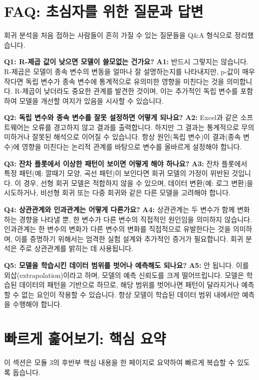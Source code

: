 \documentclass[11pt,a4paper]{article}
\begin{document}
\newpage
\section*{FAQ: 초심자를 위한 질문과 답변}
회귀 분석을 처음 접하는 사람들이 흔히 가질 수 있는 질문들을 Q\&A 형식으로 정리했습니다.

\begin{tcolorbox}[colback=myblue!10!white,colframe=myblue!50!black,title={자주 묻는 질문}]
\textbf{Q1: R-제곱 값이 낮으면 모델이 쓸모없는 건가요?}
\textbf{A1:} 반드시 그렇지는 않습니다. R-제곱은 모델이 종속 변수의 변동을 얼마나 잘 설명하는지를 나타내지만, p-값이 매우 작다면 독립 변수가 종속 변수에 통계적으로 유의미한 영향을 미친다는 것을 의미합니다. R-제곱이 낮더라도 중요한 관계를 발견한 것이며, 이는 추가적인 독립 변수를 포함하여 모델을 개선할 여지가 있음을 시사할 수 있습니다.

\textbf{Q2: 독립 변수와 종속 변수를 잘못 설정하면 어떻게 되나요?}
\textbf{A2:} Excel과 같은 소프트웨어는 오류를 경고하지 않고 결과를 출력합니다. 하지만 그 결과는 통계적으로 무의미하거나 잘못된 해석으로 이어질 수 있습니다. 항상 원인(독립 변수)이 결과(종속 변수)에 영향을 미친다는 논리적 관계를 바탕으로 변수를 올바르게 설정해야 합니다.

\textbf{Q3: 잔차 플롯에서 이상한 패턴이 보이면 어떻게 해야 하나요?}
\textbf{A3:} 잔차 플롯에서 특정 패턴(예: 깔때기 모양, 곡선 패턴)이 보인다면 회귀 모델의 가정이 위반된 것입니다. 이 경우, 선형 회귀 모델은 적합하지 않을 수 있으며, 데이터 변환(예: 로그 변환)을 시도하거나, 비선형 회귀 또는 다중 회귀와 같은 다른 모델을 고려해야 합니다.

\textbf{Q4: 상관관계와 인과관계는 어떻게 다른가요?}
\textbf{A4:} 상관관계는 두 변수가 함께 변화하는 경향을 나타낼 뿐, 한 변수가 다른 변수의 직접적인 원인임을 의미하지 않습니다. 인과관계는 한 변수의 변화가 다른 변수의 변화를 직접적으로 유발한다는 것을 의미하며, 이를 증명하기 위해서는 엄격한 실험 설계와 추가적인 증거가 필요합니다. 회귀 분석은 주로 상관관계를 밝히는 데 사용됩니다.

\textbf{Q5: 모델을 학습시킨 데이터 범위를 벗어나 예측해도 되나요?}
\textbf{A5:} 안 됩니다. 이를 외삽(extrapolation)이라고 하며, 모델의 예측 신뢰도를 크게 떨어뜨립니다. 모델은 학습된 데이터의 패턴을 기반으로 하므로, 해당 범위를 벗어나면 패턴이 달라지거나 예측할 수 없는 요인이 작용할 수 있습니다. 항상 모델이 학습된 데이터 범위 내에서만 예측을 수행해야 합니다.
\end{tcolorbox}

\newpage
\section*{빠르게 훑어보기: 핵심 요약}
이 섹션은 모듈 3의 후반부 핵심 내용을 한 페이지로 요약하여 빠르게 복습할 수 있도록 돕습니다.
\end{document}

